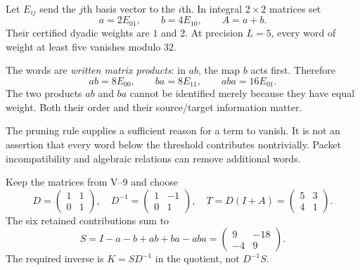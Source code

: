 Let $E_{ij}$ send the $j$th basis vector to the $i$th. In integral $2\times2$ matrices set
\[
a=2E_{01},\qquad b=4E_{10},\qquad A=a+b.
\]
Their certified dyadic weights are $1$ and $2$. At precision $L=5$, every word of weight at least five vanishes modulo $32$.


The words are \emph{written matrix products}: in $ab$, the map $b$ acts first. Therefore
\[
ab=8E_{00},\qquad ba=8E_{11},\qquad aba=16E_{01}.
\]
The two products $ab$ and $ba$ cannot be identified merely because they have equal weight. Both their order and their source/target information matter.

The pruning rule supplies a sufficient reason for a term to vanish. It is not an assertion that every word below the threshold contributes nontrivially. Packet incompatibility and algebraic relations can remove additional words.


Keep the matrices from V--9 and choose
\[
D=\begin{pmatrix}1&1\\0&1\end{pmatrix},\quad
D^{-1}=\begin{pmatrix}1&-1\\0&1\end{pmatrix},\quad
T=D(I+A)=\begin{pmatrix}5&3\\4&1\end{pmatrix}.
\]
The six retained contributions sum to
\[
S=I-a-b+ab+ba-aba
=\begin{pmatrix}9&-18\\-4&9\end{pmatrix}.
\]
The required inverse is $K=SD^{-1}$ in the quotient, not $D^{-1}S$.

